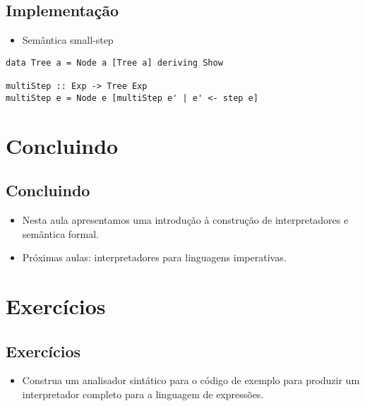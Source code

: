 \documentclass[11pt]{article}
\begin{document}
\subsection*{Implementação}
\label{sec:orgc49b35a}

\begin{itemize}
\item Semântica small-step
\end{itemize}

\begin{verbatim}
data Tree a = Node a [Tree a] deriving Show

multiStep :: Exp -> Tree Exp
multiStep e = Node e [multiStep e' | e' <- step e]
\end{verbatim}
\section*{Concluindo}
\label{sec:org783d2a9}

\subsection*{Concluindo}
\label{sec:org0956a9c}

\begin{itemize}
\item Nesta aula apresentamos uma introdução à construção de interpretadores e
semântica formal.

\item Próximas aulas: interpretadores para linguagens imperativas.
\end{itemize}
\section*{Exercícios}
\label{sec:org53f1a64}

\subsection*{Exercícios}
\label{sec:orgc04a765}

\begin{itemize}
\item Construa um analisador sintático para o código de exemplo para produzir um
interpretador completo para a linguagem de expressões.
\end{itemize}
\end{document}
